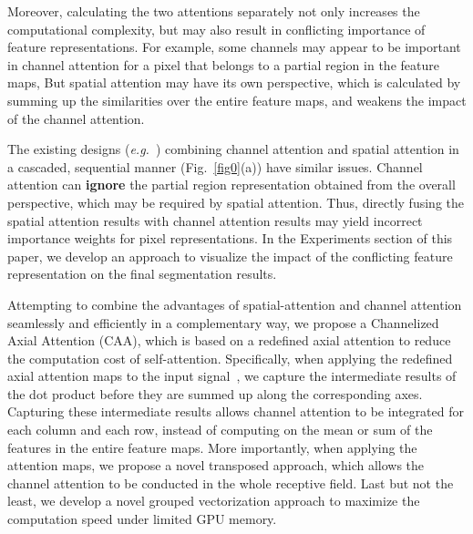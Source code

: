 \documentclass[journal]{IEEEtran}
\begin{document}
Moreover, calculating the two attentions separately not only increases the computational complexity, but may also result in conflicting importance of feature representations. 
For example, some channels may appear to be important in channel attention for a pixel that belongs to a partial region in the feature maps, But spatial attention may have its own perspective, which is calculated by summing up the similarities over the entire feature maps, and weakens the impact of the channel attention. 

The existing designs (\textit{e.g.}~\cite{cCBAM}) combining channel attention and spatial attention in a cascaded, sequential manner (Fig.~\ref{fig0}(a)) have similar issues. 
Channel attention can \textbf{ignore} the partial region representation obtained from the overall perspective, which may be required by spatial attention. 
Thus, directly fusing the spatial attention results with channel attention results may yield incorrect importance weights for pixel representations. 
In the Experiments section of this paper, we develop an approach to visualize the impact of the conflicting feature representation on the final segmentation results. 

Attempting to combine the advantages of spatial-attention and channel attention seamlessly and efficiently in a complementary way, we propose a Channelized Axial Attention (CAA), which is based on a redefined axial attention to reduce the computation cost of self-attention. 
Specifically, when applying the redefined axial attention maps to the input signal~\cite{cNonLocal}, we capture the intermediate results of the dot product before they are summed up along the corresponding axes. 
Capturing these intermediate results allows channel attention to be integrated for each column and each row, instead of computing on the mean or sum of the features in the entire feature maps.
More importantly, when applying the attention maps, we propose a novel transposed approach, which allows the channel attention to be conducted in the whole receptive field.
Last but not the least, we develop a novel grouped vectorization approach to maximize the computation speed under limited GPU memory.
\end{document}
